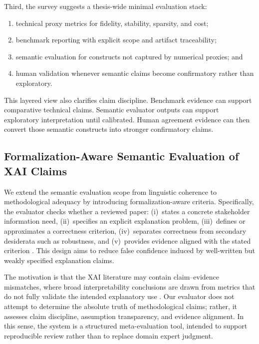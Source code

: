 \documentclass[twoside,11pt]{article}
\begin{document}
Third, the survey suggests a thesis-wide minimal evaluation stack:
\begin{enumerate}[leftmargin=*]
\item technical proxy metrics for fidelity, stability, sparsity, and
cost;
\item benchmark reporting with explicit scope and artifact
traceability;
\item semantic evaluation for constructs not captured by numerical
proxies; and
\item human validation whenever semantic claims become confirmatory
rather than exploratory.
\end{enumerate}

This layered view also clarifies claim discipline. Benchmark evidence
can support comparative technical claims. Semantic evaluator outputs can
support exploratory interpretation until calibrated. Human agreement
evidence can then convert those semantic constructs into stronger
confirmatory claims.

\subsection{Formalization-Aware Semantic Evaluation of XAI Claims}
\label{sec:formalization_aware}

We extend the semantic evaluation scope from linguistic coherence to
methodological adequacy by introducing formalization-aware criteria. Specifically,
the evaluator checks whether a reviewed paper: (i)~states a concrete stakeholder
information need, (ii)~specifies an explicit explanation problem,
(iii)~defines or approximates a correctness criterion, (iv)~separates correctness
from secondary desiderata such as robustness, and (v)~provides evidence aligned
with the stated criterion \citep{haufe2026formalization,sokol2020factsheets}.
This design aims to reduce false confidence induced by well-written but weakly
specified explanation claims.

The motivation is that the XAI literature may contain claim--evidence mismatches,
where broad interpretability conclusions are drawn from metrics that do not fully
validate the intended explanatory use \citep{haufe2026formalization,hedstrom2023quantus}.
Our evaluator does not attempt to determine the absolute truth of methodological
claims; rather, it assesses claim discipline, assumption transparency, and evidence
alignment. In this sense, the system is a structured meta-evaluation tool, intended
to support reproducible review rather than to replace domain expert judgment.
\end{document}
